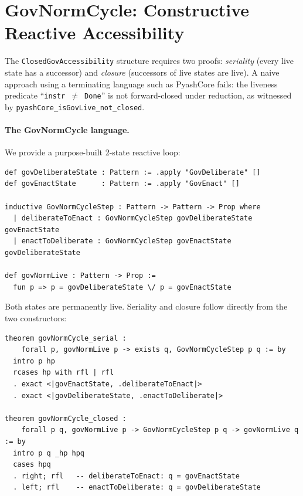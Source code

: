 \documentclass[]{article}
\newcommand{\code}[1]{\texttt{#1}}
\begin{document}
\section{GovNormCycle: Constructive Reactive Accessibility}
\label{sec:govnorm}

The \code{ClosedGovAccessibility} structure requires two proofs:
\emph{seriality} (every live state has a successor) and
\emph{closure} (successors of live states are live).
A naive approach using a terminating language such as PyashCore fails:
the liveness predicate ``\code{instr $\neq$ Done}'' is not forward-closed under
reduction, as witnessed by \code{pyashCore\_isGovLive\_not\_closed}.

\paragraph{The GovNormCycle language.}
We provide a purpose-built 2-state reactive loop:

\begin{lstlisting}
def govDeliberateState : Pattern := .apply "GovDeliberate" []
def govEnactState      : Pattern := .apply "GovEnact" []

inductive GovNormCycleStep : Pattern -> Pattern -> Prop where
  | deliberateToEnact : GovNormCycleStep govDeliberateState govEnactState
  | enactToDeliberate : GovNormCycleStep govEnactState govDeliberateState

def govNormLive : Pattern -> Prop :=
  fun p => p = govDeliberateState \/ p = govEnactState
\end{lstlisting}

\noindent
Both states are permanently live.  Seriality and closure follow directly from
the two constructors:

\begin{lstlisting}
theorem govNormCycle_serial :
    forall p, govNormLive p -> exists q, GovNormCycleStep p q := by
  intro p hp
  rcases hp with rfl | rfl
  . exact <|govEnactState, .deliberateToEnact|>
  . exact <|govDeliberateState, .enactToDeliberate|>

theorem govNormCycle_closed :
    forall p q, govNormLive p -> GovNormCycleStep p q -> govNormLive q := by
  intro p q _hp hpq
  cases hpq
  . right; rfl   -- deliberateToEnact: q = govEnactState
  . left; rfl    -- enactToDeliberate: q = govDeliberateState
\end{lstlisting}
\end{document}
